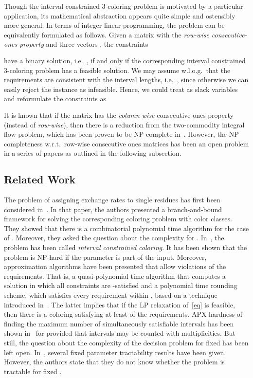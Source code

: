 \documentclass[a4paper,11pt]{article}
\theoremstyle{theorem}
\begin{document}
Though the interval constrained 3-coloring problem is motivated by a particular application, its mathematical abstraction appears quite simple and ostensibly more general. In terms of integer linear programming, the problem can be equivalently formulated as follows. Given a matrix  with the \emph{row-wise consecutive-ones property} and three vectors , the constraints

have a binary solution, i.e.~, if and only if the corresponding interval constrained 3-coloring problem has a feasible solution. We may assume w.l.o.g.~that the requirements are consistent with the interval lengths, i.e.~, since otherwise we can easily reject the instance as infeasible. Hence, we could treat  as slack variables and reformulate the constraints as

It is known that if the matrix  has the \emph{column-wise} consecutive ones property (instead of \emph{row-wise}), then there is a reduction from the two-commodity integral flow problem, which has been proven to be NP-complete in~\cite{EIS76}. However, the NP-completeness w.r.t.~row-wise consecutive ones matrices has been an open problem in a series of papers as outlined in the following subsection. 

\subsection{Related Work}

The problem of assigning exchange rates to single residues has first been considered in~\cite{SAC08}. In that paper, the authors presented a branch-and-bound framework for solving the corresponding coloring problem with  color classes. They showed that there is a combinatorial polynomial time algorithm for the case of . Moreover, they asked the question about the complexity for . In~\cite{SWAT08}, the problem has been called \emph{interval constrained coloring}. It has been shown that the problem is NP-hard if the parameter  is part of the input. Moreover, approximation algorithms have been presented that allow violations of the requirements. That is, a quasi-polynomial time algorithm that computes a solution in which all constraints are -satisfied and a polynomial time rounding scheme, which satisfies every requirement within , based on a technique introduced in~\cite{GKPS06}. The latter implies that if the LP relaxation of~\eqref{eq} is feasible, then there is a coloring satisfying at least  of the requirements. APX-hardness of finding the maximum number of simultaneously satisfiable intervals has been shown in~\cite{Can08} for  provided that intervals may be counted with multiplicities. But still, the question about the complexity of the decision problem for fixed  has been left open. In~\cite{KNU09}, several fixed parameter tractability results have been given. However, the authors state that they do not know whether the problem is tractable for fixed . 
\end{document}

